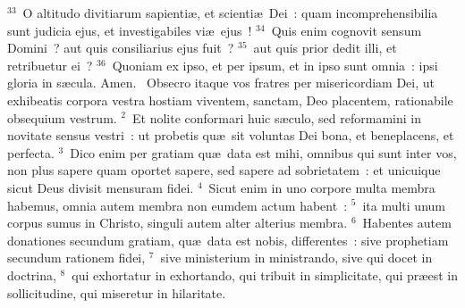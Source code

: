 ${}^{33}$~O altitudo divitiarum sapienti\ae , et scienti\ae\ Dei~: quam incomprehensibilia sunt judicia ejus, et investigabiles vi\ae\ ejus~!
${}^{34}$~Quis enim cognovit sensum Domini~? aut quis consiliarius ejus fuit~?
${}^{35}$~aut quis prior dedit illi, et retribuetur ei~?
${}^{36}$~Quoniam ex ipso, et per ipsum, et in ipso sunt omnia~: ipsi gloria in s\ae cula. Amen.
~Obsecro itaque vos fratres per misericordiam Dei, ut exhibeatis corpora vestra hostiam viventem, sanctam, Deo placentem, rationabile obsequium vestrum.
${}^{2}$~Et nolite conformari huic s\ae culo, sed reformamini in novitate sensus vestri~: ut probetis qu\ae\ sit voluntas Dei bona, et beneplacens, et perfecta.
${}^{3}$~Dico enim per gratiam qu\ae\ data est mihi, omnibus qui sunt inter vos, non plus sapere quam oportet sapere, sed sapere ad sobrietatem~: et unicuique sicut Deus divisit mensuram fidei.
${}^{4}$~Sicut enim in uno corpore multa membra habemus, omnia autem membra non eumdem actum habent~:
${}^{5}$~ita multi unum corpus sumus in Christo, singuli autem alter alterius membra.
${}^{6}$~Habentes autem donationes secundum gratiam, qu\ae\ data est nobis, differentes~: sive prophetiam secundum rationem fidei,
${}^{7}$~sive ministerium in ministrando, sive qui docet in doctrina,
${}^{8}$~qui exhortatur in exhortando, qui tribuit in simplicitate, qui pr\ae est in sollicitudine, qui miseretur in hilaritate.


